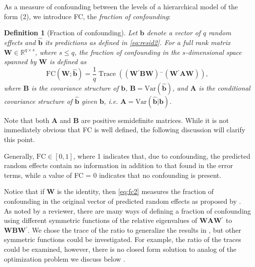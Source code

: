 \documentclass[12pt]{article} %
\newtheorem{definition}{Definition}
\newcommand{\ginv}{\ensuremath{^{-}}}
\newcommand{\trans}{\ensuremath{^\prime}}
\newcommand{\var}{\ensuremath{\mathrm{Var}}}
\DeclareMathOperator{\tr}{Trace}
\begin{document}
As a measure of confounding between the levels of a hierarchical model of the form (2), we introduce FC, the {\it fraction of confounding}:
\begin{definition}[Fraction of confounding] 
Let $\bm{b}$ denote a vector of $q$ random effects and $\widehat{\bm{b}}$ its predictions as defined in \eqref{eq:resid2}. For a full rank matrix $\bm{W} \in \mathbb{R}^{q \times s}$, where $ s \le q$, the fraction of confounding in the $s$-dimensional space spanned by $\bm{W}$ is defined as 
\begin{equation}\label{eq:fc2}
\text{FC}(\bm{W}; \widehat{\bm{b}}) = \frac{1}{q} \tr\left( \left(\bm{W\trans B W} \right)\ginv \left(\bm{W\trans A W}\right) \right),
\end{equation}
where $\bm{B}$ is the covariance structure of $\bm b$, $\bm{B} = \var(\widehat{\bm{b}})$, and $\bm{A}$ is the conditional covariance structure of  $\widehat{\bm{b}}$ given $\bm{b}$,  i.e. $\bm{A} = \var(\widehat{\bm{b}} | \bm{b} )$.
\end{definition}
\noindent
Note that both $\bm{A}$ and $\bm{B}$ are  positive semidefinite matrices. While it is not immediately obvious that FC %
is well defined,  the following discussion will clarify this point. %

Generally, $\text{FC} \in [0,1]$, where 1 indicates that, due to confounding, the predicted random effects contain no information in addition to that found in the error terms, while a value of FC = 0 indicates that no confounding is present. 

Notice that if $\bm{W}$ is the identity, then \eqref{eq:fc2} measures the fraction of confounding in the original vector of predicted random effects as proposed by  \cite{HildenMinton:1995wh}. As noted by a reviewer, there are many ways of defining a fraction of confounding using different symmetric functions of the relative eigenvalues of $\bm{WAW}\trans$ to $\bm{WBW}\trans$. We chose the trace of the ratio to generalize the results in \cite{HildenMinton:1995wh}, but other symmetric functions could be investigated. For example, the ratio of the traces could be examined, however, there is no closed form solution to analog of the optimization problem we discuss below \citep[cf.,][]{Jia:2009ux}. 
\end{document}
